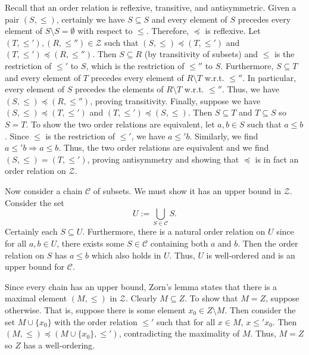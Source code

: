 \documentclass[../../master.tex]{subfiles}
\begin{document}
    \begin{solution}
        Recall that an order relation is reflexive, transitive, and
        antisymmetric. Given a pair $(S, \leq)$, certainly we have $S \subseteq
        S$ and every element of $S$ precedes every element of $S \setminus S =
        \emptyset$ with respect to $\leq$. Therefore, $\preceq$ is reflexive.
        Let $(T, \leq'), (R, \leq'') \in \mathscr{Z}$ such that $(S, \leq)
        \preceq (T, \leq')$ and $(T, \leq') \preceq (R, \leq'')$. Then $S
        \subseteq R$ (by transitivity of subsets) and $\leq$ is the restriction
        of $\leq'$ to $S$, which is the restriction of $\leq''$ to $S$.
        Furthermore, $S \subseteq T$ and every element of $T$ precedes every
        element of $R \setminus T$ w.r.t. $\leq''$. In particular, every element
        of $S$ precedes the elements of $R \setminus T$ w.r.t. $\leq''$. Thus,
        we have $(S, \leq) \preceq (R, \leq'')$, proving transitivity. Finally,
        suppose we have $(S, \leq) \preceq (T, \leq')$ and $(T, \leq') \preceq
        (S, \leq)$. Then $S \subseteq T$ and $T \subseteq S$ so $S = T$. To show
        the two order relations are equivalent, let $a, b \in S$ such that $a
        \leq b$. Since $\leq$ is the restriction of $\leq'$, we have $a \leq'
        b$. Similarly, we find $a \leq' b \Longrightarrow a \leq b$. Thus, the
        two order relations are equivalent and we find $(S, \leq) = (T, \leq')$,
        proving antisymmetry and showing that $\preceq$ is in fact an order
        relation on $\mathscr{Z}$.

        Now consider a chain $\mathscr{C}$ of subsets.
        We must show it has an upper bound in $\mathscr{Z}$. Consider the set
        \[
            U := \bigcup_{S \in \mathscr{C}} S.
        \]
        Certainly each $S \subseteq U$. Furthermore, there is a natural order
        relation on $U$ since for all $a, b \in U$, there exists some $S \in
        \mathscr{C}$ containing both $a$ and $b$. Then the order relation on
        $S$ has $a \leq b$ which also holds in $U$. Thus, $U$ is well-ordered
        and is an upper bound for $\mathscr{C}$.

        Since every chain has an upper bound, Zorn's lemma states that there is
        a maximal element $(M, \leq)$ in $\mathscr{Z}$. Clearly $M \subseteq Z$.
        To show that $M = Z$, suppose otherwise. That is, suppose there is some
        element $x_0 \in Z \setminus M$. Then consider the set $M \cup \{x_0\}$ with
        the order relation $\leq'$ such that for all $x \in M$, $x \leq' x_{0}$.
        Then $(M, \leq) \preceq (M \cup \{x_0\}, \leq')$, contradicting the maximality
        of $M$. Thus, $M = Z$ so $Z$ has a well-ordering.
    \end{solution}
\end{document}
